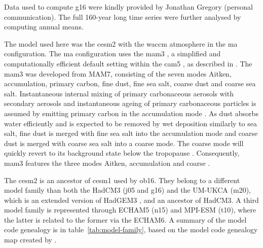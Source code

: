 \documentclass{ametsocV6.1}
\begin{document}
Data used to compute \gls{g16} were kindly provided by Jonathan Gregory (personal
communication). The full 160-year long time series were further analysed by computing
annual means.

\appendix[C]


The model used here was the \gls{cesm2} with the \gls{waccm} atmosphere in the \gls{ma}
configuration. The \gls{ma} configuration uses the \gls{mam3} \citep{gettleman2019}, a
simplified and computationally efficient default setting within the \gls{cam5}
\citep{liu2016}, as described in \citet{liu2012}. The \gls{mam3} was developed from
MAM7, consisting of the seven modes Aitken, accumulation, primary carbon, fine dust,
fine sea salt, coarse dust and coarse sea salt. Instantaneous internal mixing of primary
carbonaceous aerosols with secondary aerosols and instantaneous ageing of primary
carbonaceous particles is assumed by emitting primary carbon in the accumulation mode
\citep{liu2016}. As dust absorbs water efficiently and is expected to be removed by wet
deposition similarly to sea salt, fine dust is merged with fine sea salt into the
accumulation mode and coarse dust is merged with coarse sea salt into a coarse mode. The
coarse mode will quickly revert to its background state below the tropopause
\citep{liu2012}. Consequently, \gls{mam3} features the three modes Aitken, accumulation
and coarse \citep{liu2016}.

The \gls{cesm2} is an ancestor of \gls{cesm1} used by \gls{ob16}. They belong to a
different model family than both the HadCM3 (\gls{j05} and \gls{g16}) and the UM-UKCA
(\gls{m20}), which is an extended version of HadGEM3 \citep{dhomse2014}, and an ancestor
of HadCM3. A third model family is represented through ECHAM5 (\gls{n15}) and MPI-ESM
(\gls{t10}), where the latter is related to the former via the ECHAM6. A summary of the
model code genealogy is in table~\ref{tab:model-family}, based on the model code
genealogy map created by \citet{kuma2023}.
\end{document}
